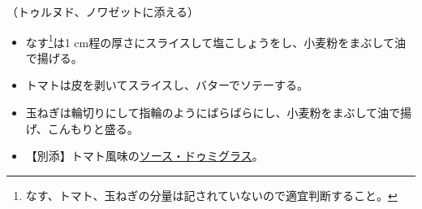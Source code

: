 \begin{recette}
（トゥルヌド、ノワゼットに添える）

\begin{itemize}
\item
  なす\footnote{なす、トマト、玉ねぎの分量は記されていないので適宜判断すること。}は1
  cm程の厚さにスライスして塩こしょうをし、小麦粉をまぶして油で揚げる。
\item
  トマトは皮を剥いてスライスし、バターでソテーする。
\item
  玉ねぎは輪切りにして指輪のようにばらばらにし、小麦粉をまぶして油で揚げ、こんもりと盛る。
\item
  【別添】トマト風味の\protect\hyperlink{sauce-demi-glace}{ソース・ドゥミグラス}。
\end{itemize}

\atoaki{}

\hypertarget{garniture-banquiere}{%
}
\end{recette}
